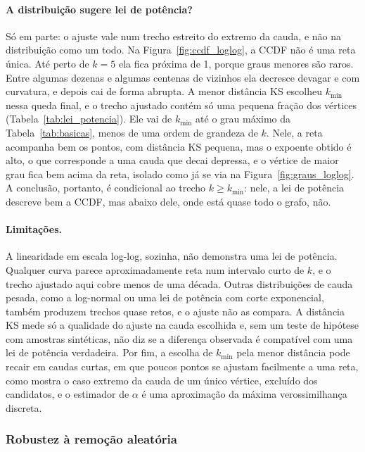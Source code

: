 \paragraph{A distribuição sugere lei de potência?} Só em parte: o ajuste vale num trecho estreito do extremo da cauda, e não na distribuição como um todo. Na Figura~\ref{fig:ccdf_loglog}, a CCDF não é uma reta única. Até perto de $k = 5$ ela fica próxima de 1, porque graus menores são raros. Entre algumas dezenas e algumas centenas de vizinhos ela decresce devagar e com curvatura, e depois cai de forma abrupta. A menor distância KS escolheu $k_{\min}$ nessa queda final, e o trecho ajustado contém só uma pequena fração dos vértices (Tabela~\ref{tab:lei_potencia}). Ele vai de $k_{\min}$ até o grau máximo da Tabela~\ref{tab:basicas}, menos de uma ordem de grandeza de $k$. Nele, a reta acompanha bem os pontos, com distância KS pequena, mas o expoente obtido é alto, o que corresponde a uma cauda que decai depressa, e o vértice de maior grau fica bem acima da reta, isolado como já se via na Figura~\ref{fig:graus_loglog}. A conclusão, portanto, é condicional ao trecho $k \geq k_{\min}$: nele, a lei de potência descreve bem a CCDF, mas abaixo dele, onde está quase todo o grafo, não.

\paragraph{Limitações.} A linearidade em escala log-log, sozinha, não demonstra uma lei de potência. Qualquer curva parece aproximadamente reta num intervalo curto de $k$, e o trecho ajustado aqui cobre menos de uma década. Outras distribuições de cauda pesada, como a log-normal ou uma lei de potência com corte exponencial, também produzem trechos quase retos, e o ajuste não as compara. A distância KS mede só a qualidade do ajuste na cauda escolhida e, sem um teste de hipótese com amostras sintéticas, não diz se a diferença observada é compatível com uma lei de potência verdadeira. Por fim, a escolha de $k_{\min}$ pela menor distância pode recair em caudas curtas, em que poucos pontos se ajustam facilmente a uma reta, como mostra o caso extremo da cauda de um único vértice, excluído dos candidatos, e o estimador de $\alpha$ é uma aproximação da máxima verossimilhança discreta.

\subsubsection{Robustez à remoção aleatória}

